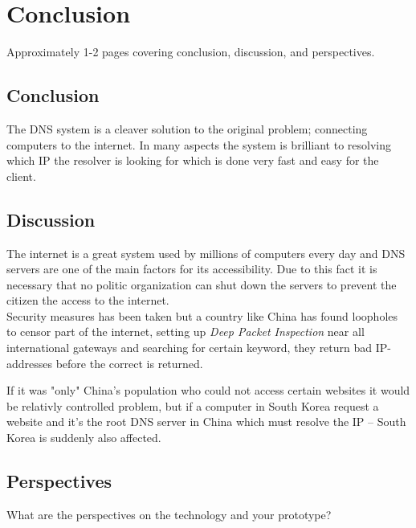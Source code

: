 \documentclass[Preamble]{subfiles}
\begin{document}
\chapter{Conclusion}
Approximately 1-2 pages covering conclusion, discussion, and perspectives.




\section{Conclusion}

The DNS system is a cleaver solution to the original problem; connecting computers to the internet.
In many aspects the system is brilliant to resolving which IP the resolver is looking for which is done very fast and easy for the client.




\section{Discussion}


The internet is a great system used by millions of computers every day and DNS servers are one of the main factors for its accessibility. 
Due to this fact it is necessary that no politic organization can shut down the servers to prevent the citizen the access to the internet.
\\
Security measures has been taken but a country like China has found loopholes to censor part of the internet, setting up \textit{Deep Packet Inspection} near all international gateways and searching for certain keyword, they  return bad IP-addresses before the correct is returned\cite{GFW}.

If it was "only" China's population who could not access certain websites it would be relativly controlled problem, but if a computer in South Korea request a website and it's the root DNS server in China which must resolve the IP -- South Korea is suddenly also affected.


\section{Perspectives}
What are the perspectives on the technology and your prototype? 
\end{document}
